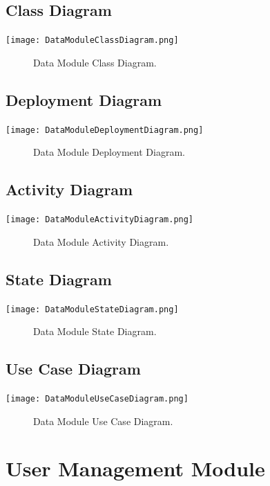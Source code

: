 \documentclass[12pt]{article}
\begin{document}
	\subsection{Class Diagram}
        \texttt{[image: DataModuleClassDiagram.png]}
        \begin{figure}[h]
            \caption{Data Module Class Diagram.}
        \end{figure}
    
    \subsection{Deployment Diagram}
        \texttt{[image: DataModuleDeploymentDiagram.png]}
        \begin{figure}[h]
            \caption{Data Module Deployment Diagram.}
        \end{figure}
        
    \subsection{Activity Diagram}
        \texttt{[image: DataModuleActivityDiagram.png]}
        \begin{figure}[h]
            \caption{Data Module Activity Diagram.}
        \end{figure}
	
	\subsection{State Diagram}
       \texttt{[image: DataModuleStateDiagram.png]}
        \begin{figure}[h]
        	\caption{Data Module State Diagram.}
        \end{figure}
	
	\subsection{Use Case Diagram}
        	\texttt{[image: DataModuleUseCaseDiagram.png]}
        	\begin{figure}[h]
        		\caption{Data Module Use Case Diagram.}
        	\end{figure}
	
	\section{User Management Module}
	
\end{document}
